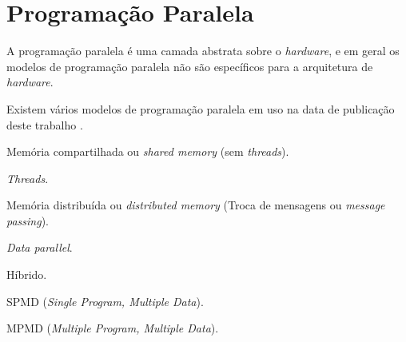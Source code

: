 
\section{Programação Paralela}

A programação paralela é uma camada abstrata sobre o \textit{hardware}, e em 
geral os modelos de programação paralela não são específicos para a arquitetura
de \textit{hardware}.

Existem vários modelos de programação paralela em uso na data de publicação
deste trabalho \cite{aapc}.

\begin{alineas}
        \item Memória compartilhada ou \textit{shared memory} (sem
                        \textit{threads}).
        \item \textit{Threads}.
        \item Memória distribuída ou \textit{distributed memory} (Troca de
                        mensagens ou \textit{message passing}).
        \item \textit{Data parallel}.
        \item Híbrido.
        \item SPMD (\textit{Single Program, Multiple Data}).
        \item MPMD (\textit{Multiple Program, Multiple Data}).
\end{alineas}



